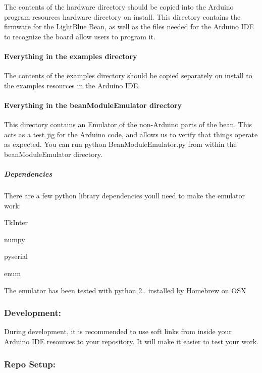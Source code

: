 The contents of the hardware directory should be copied into the Arduino program resources hardware directory on install. This directory contains the firmware for the Light\+Blue Bean, as well as the files needed for the Arduino I\+D\+E to recognize the board allow users to program it.

\paragraph*{Everything in the {\ttfamily examples} directory}

The contents of the examples directory should be copied separately on install to the examples resources in the Arduino I\+D\+E.

\paragraph*{Everything in the {\ttfamily bean\+Module\+Emulator} directory}

This directory contains an Emulator of the \textquotesingle{}non-\/\+Arduino\textquotesingle{} parts of the bean. This acts as a test jig for the Arduino code, and allows us to verify that things operate as expected. You can run {\ttfamily python Bean\+Module\+Emulator.\+py} from within the bean\+Module\+Emulator directory.

\subparagraph*{Dependencies}

There are a few python library dependencies you\textquotesingle{}ll need to make the emulator work\+:


\begin{DoxyItemize}
\item Tk\+Inter
\item numpy
\item pyserial
\item enum
\end{DoxyItemize}

The emulator has been tested with python 2.. installed by Homebrew on O\+S\+X

\subsubsection*{Development\+:}

During development, it is recommended to use soft links from inside your Arduino I\+D\+E resources to your repository. It will make it easier to test your work.

\subsubsection*{Repo Setup\+:}

